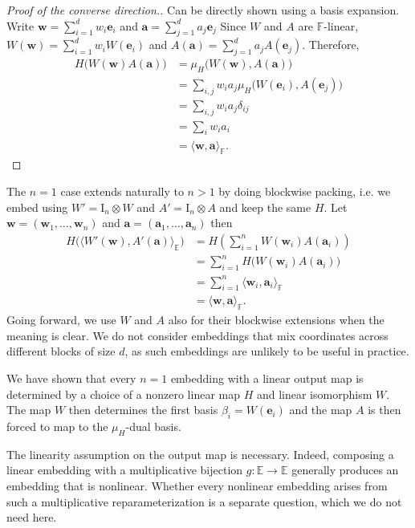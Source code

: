 \documentclass[11pt,letterpaper,usenames,dvipsnames]{article}
\begin{document}
\begin{proof}[Proof of the converse direction.] Can be directly shown using a basis expansion. 
Write $\mathbf w=\sum_{i=1}^d w_i\mathbf e_i$ and $\mathbf a=\sum_{j=1}^d a_j\mathbf e_j$
Since $W$ and $A$ are $\mathbb F$-linear, $W(\mathbf w) = \sum_{i=1}^d w_iW(\mathbf e_i)$ and $A(\mathbf a) = \sum_{j=1}^d a_jA(\mathbf e_j)$. Therefore,
\[
\begin{aligned}
H\bigl(W(\mathbf w)A(\mathbf a)\bigr)
&=
\mu_H\bigl(W(\mathbf w),A(\mathbf a)\bigr)\\
&=
\sum_{i,j}
w_i a_j
\mu_H\bigl(W(\mathbf e_i),A(\mathbf e_j)\bigr)\\
&=
\sum_{i,j}
w_i a_j\delta_{ij}\\
&=
\sum_iw_ia_i\\
&=
\langle\mathbf w,\mathbf a\rangle_{\mathbb F}.
\end{aligned}
\]
\end{proof}

The $n=1$ case extends naturally to $n>1$ by doing blockwise packing, i.e. we embed using $W' = \mathrm{I}_n \otimes W$ and $A' = \mathrm{I}_n \otimes A$ and keep the same $H$. Let $\mathbf{w} = (\mathbf{w}_1, \dots, \mathbf{w}_n)$ and $\mathbf{a} = (\mathbf{a}_1, \dots, \mathbf{a}_n)$ then
\[
\begin{aligned}
H\bigl( \langle W'(\mathbf{w}), A'(\mathbf{a}) \rangle_{\mathbb{E}} \bigr)
&= H\left( \sum_{i=1}^n W(\mathbf{w}_i) A(\mathbf{a}_i) \right) \\
&= \sum_{i=1}^n H\bigl( W(\mathbf{w}_i) A(\mathbf{a}_i) \bigr) \\
&= \sum_{i=1}^n \langle \mathbf{w}_i,\mathbf{a}_i \rangle_{\mathbb{F}} \\
&= \langle \mathbf{w},\mathbf{a} \rangle_{\mathbb{F}}.
\end{aligned}
\]
Going forward, we use $W$ and $A$ also for their blockwise extensions when the meaning is clear. We do not consider embeddings that mix coordinates across different blocks of size $d$, as such embeddings are unlikely to be useful in practice.

We have shown that every $n=1$ embedding with a linear output map is determined by a choice of a nonzero linear map $H$ and linear isomorphism $W$. The map $W$ then determines the first basis $\beta_i=W(\mathbf e_i)$ and the map $A$ is then forced to map to the $\mu_H$-dual basis.

The linearity assumption on the output map is necessary. Indeed, composing a linear embedding with a multiplicative bijection $g:\mathbb E\to\mathbb E$ generally produces an embedding that is nonlinear. Whether every nonlinear embedding arises from such a multiplicative reparameterization is a separate question, which we do not need here.
\end{document}
